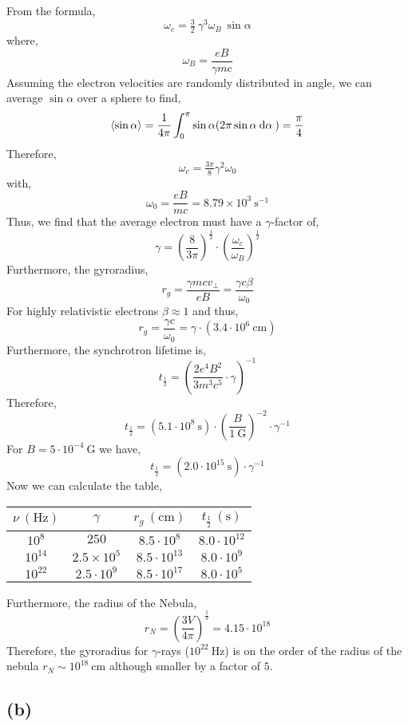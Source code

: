\documentclass[12pt]{article}
\begin{document}
From the formula,
\[ \omega_c = \tfrac{3}{2} \: \gamma^3 \omega_B  \: \sin{\alpha} \]
where,
\[ \omega_B = \frac{e B}{\gamma m c} \]
Assuming the electron velocities are randomly distributed in angle, we can average $\sin{\alpha}$ over a sphere to find,
\[ \left< \sin{\alpha} \right> = \frac{1}{4 \pi} \int_{0}^{\pi} \sin{\alpha} (2 \pi \sin{\alpha} \: \mathrm{d}\alpha \:) = \frac{\pi}{4} \]
Therefore,
\[ \omega_c = \tfrac{3 \pi}{8} \gamma^2 \omega_0 \]
with,
\[ \omega_0 = \frac{e B}{m c} = 8.79 \times 10^3 \: \mathrm{s}^{-1} \]
Thus, we find that the average electron must have a $\gamma$-factor of,
\[ \gamma = \left( \frac{8}{3 \pi} \right)^{\frac{1}{2}} \cdot \left( \frac{\omega_c}{\omega_B} \right)^{\frac{1}{2}} \]
Furthermore, the gyroradius,
\[ r_g = \frac{\gamma m c v_\perp}{eB} = \frac{\gamma c \beta}{\omega_0}  \]
For highly relativistic electrons $\beta \approx 1$ and thus,
\[ r_g = \frac{\gamma c}{\omega_0} = \gamma \cdot (3.4 \cdot 10^{6} \: \mathrm{cm}) \]
Furthermore, the synchrotron lifetime is,
\[ t_{\frac{1}{2}} = \left( \frac{2 e^4 B^2}{3 m^3 c^5} \cdot \gamma \right)^{-1} \]
Therefore,
\[ t_{\frac{1}{2}} = (5.1 \cdot 10^8 \: \mathrm{s}) \cdot \left( \frac{B}{1 \: \mathrm{G}} \right)^{-2} \cdot \gamma^{-1} \] 
For $B = 5 \cdot 10^{-4} \: \mathrm{G}$ we have,
\[ t_{\frac{1}{2}} = (2.0 \cdot 10^{15} \: \mathrm{s}) \cdot \gamma^{-1} \] 
Now we can calculate the table,
\begin{center}
 \begin{tabular}{||c c c c||} 
 \hline
 $\nu \: (\mathrm{Hz})$ & $\gamma$ & $r_g \: (\mathrm{cm})$ & $t_{\frac{1}{2}} \: (\mathrm{s})$ 
 \\ [0.5ex] 
 \hline\hline
 $10^{8}$ & $250$ & $8.5 \cdot 10^{8}$ & $8.0 \cdot 10^{12}$ \\ 
 \hline
 $10^{14}$ & $2.5 \times 10^5$ & $8.5 \cdot 10^{13}$ & $8.0 \cdot 10^{9}$ \\
 \hline
 $10^{22}$ & $2.5 \cdot 10^{9}$ & $8.5 \cdot 10^{17}$ & $8.0 \cdot 10^{5}$ \\
 \hline
\end{tabular}
\end{center}
Furthermore, the radius of the Nebula,
\[ r_N = \left( \frac{3 V}{4 \pi} \right)^{\frac{1}{3}} = 4.15 \cdot 10^{18} \]
Therefore, the gyroradius for $\gamma$-rays ($10^{22} \: \mathrm{Hz}$) is on the order of the radius of the nebula $r_N \sim 10^{18} \: \mathrm{cm}$ although smaller by a factor of $5$. 

\subsection*{(b)}
\end{document}
